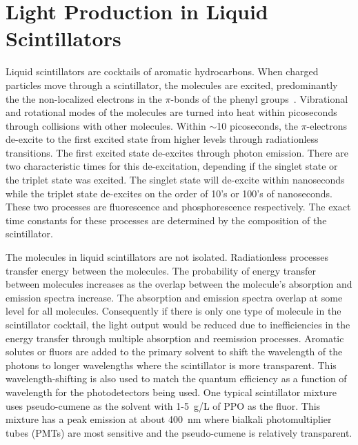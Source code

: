\documentclass[aps,prc,twocolumn,groupedaddress,showpacs,amsmath,amssymb,floatfix,superscriptaddress]{revtex4}
\begin{document}
\section{Light Production in Liquid Scintillators}
Liquid scintillators are cocktails of aromatic hydrocarbons. When
charged particles move through a scintillator, the molecules are
excited, predominantly the the non-localized electrons in the
$\pi$-bonds of the phenyl groups~\cite{birks_book}. Vibrational
and rotational modes of the molecules are turned into heat within
picoseconds through collisions with other molecules.  Within $\sim$10
picoseconds, the $\pi$-electrons de-excite to the first excited state
from higher levels through radiationless transitions. The first
excited state de-excites through photon emission. There are two
characteristic times for this de-excitation, depending if the singlet
state or the triplet state was excited.  The singlet state will
de-excite within nanoseconds while the triplet state de-excites on the
order of 10's or 100's of nanoseconds. These two processes are
fluorescence and phosphorescence respectively. The exact time
constants for these processes are determined by the composition of the
scintillator.

The molecules in liquid scintillators are not isolated. Radiationless
processes transfer energy between the molecules. The probability of
energy transfer between molecules increases as the overlap between the
molecule's absorption and emission spectra increase. The absorption
and emission spectra overlap at some level for all
molecules. Consequently if there is only one type of molecule in the
scintillator cocktail, the light output would be reduced due to
inefficiencies in the energy transfer through multiple absorption and
reemission processes. Aromatic solutes or fluors are added to the
primary solvent to shift the wavelength of the photons to longer
wavelengths where the scintillator is more transparent. This
wavelength-shifting is also used to match the quantum efficiency as a
function of wavelength for the photodetectors being used. One typical
scintillator mixture uses pseudo-cumene as the solvent with 1-5~g/L of
PPO as the fluor. This mixture has a peak emission at about 400~nm
where bialkali photomultiplier tubes (PMTs) are most sensitive and the
pseudo-cumene is relatively transparent.
\end{document}
